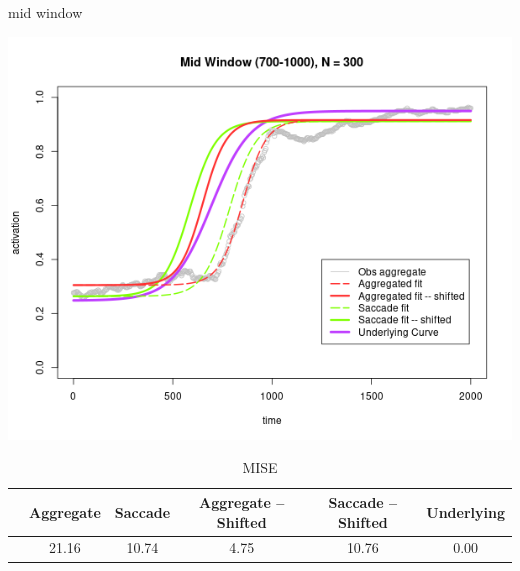 \documentclass{beamer}
\begin{document}
\begin{frame}{mid window}
\begin{center}
\includegraphics[scale=0.35]{img/mid_fit.png}
\end{center}
{\scriptsize
\begin{table}[ht]
\captionsetup{font=scriptsize}
\caption*{MISE}
\centering
\begin{tabular}{cccccc}
  \hline
 & Aggregate & Saccade & Aggregate -- Shifted & Saccade -- Shifted & Underlying \\ 
  \hline
 & 21.16 & 10.74 & 4.75 & 10.76 & 0.00 \\ 
   \hline
\end{tabular}
\end{table}
}
\end{frame}
\end{document}
